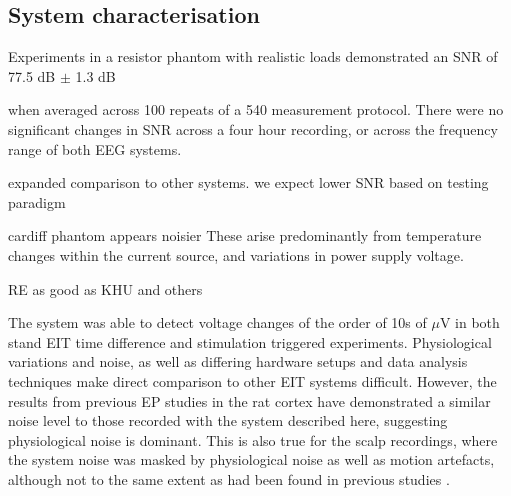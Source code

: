 \subsection{System characterisation}
Experiments in a resistor phantom with realistic loads demonstrated an SNR of 77.5 dB $\pm$ 1.3 dB 




when averaged across 100 repeats of a 540 measurement protocol. There were no significant changes in SNR across a four hour recording, or across the frequency range of both EEG systems. 


expanded comparison to other systems. we expect lower SNR based on testing paradigm

cardiff phantom appears noisier
These arise predominantly from temperature changes within the current source, and variations in power supply voltage.



RE as good as KHU and others








The system was able to detect voltage changes of the order of 10s of $\mu$V in both stand EIT time difference and stimulation triggered experiments. Physiological variations and noise, as well as differing hardware setups and data analysis techniques make direct comparison to other EIT systems difficult. However, the results from previous EP studies \cite{Oh2011} in the rat cortex have demonstrated a similar noise level to those recorded with the system described here, suggesting physiological noise is dominant. This is also true for the scalp recordings, where the system noise was masked by physiological noise as well as motion artefacts, although not to the same extent as had been found in previous studies \cite{Fabrizi_2006}. 

